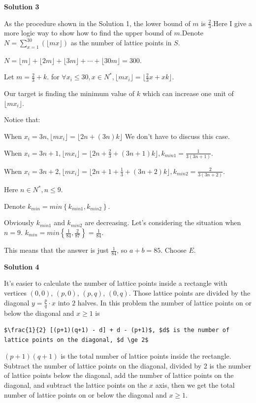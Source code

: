 \begin{enumerate}
\textbf{Solution 3}

As the procedure shown in the Solution 1, the lower bound of $m$ is $\frac{2}{3}.$Here I give a more logic way to show how to find the upper bound of $m.$Denote $N=\sum_{x=1}^{30}(\lfloor mx \rfloor)$ as the number of lattice points in $S$.

 $N = \lfloor m \rfloor+\lfloor 2m \rfloor+\lfloor 3m \rfloor+\cdots+\lfloor 30m \rfloor = 300 .$

 Let $m = \frac{2}{3}+k$. for $\forall x_{i}\le 30, x\in N^{*},  \lfloor mx_{i} \rfloor = \lfloor \frac{2}{3}x+xk \rfloor.$

 Our target is finding the minimum value of $k$ which can increase one unit of $\lfloor mx_{i} \rfloor .$

 Notice that:

 When $x_{i} = 3n, \lfloor mx_{i} \rfloor = \lfloor 2n+(3n)k \rfloor$ We don't have to discuss this case.

 When $x_{i} = 3n+1, \lfloor mx_{i} \rfloor = \lfloor 2n+\frac{2}{3}+(3n+1)k \rfloor, k_{min1}=\frac{1}{3(3n+1)}.$

 When $x_{i} = 3n+2, \lfloor mx_{i} \rfloor = \lfloor 2n+1+\frac{1}{3}+(3n+2)k \rfloor, k_{min2}=\frac{2}{3(3n+2)}.$ 

 Here $n\in N^{*}, n \le 9.$

 Denote $k_{min}=min\left \{k_{min1},k_{min2}  \right \}.$

 Obviously $k_{min1}$ and $k_{min2}$ are decreasing. Let's considering the situation when $n=9.$
$k_{min}=min\left\{\frac{1}{84},\frac{2}{87}\right\}=\frac{1}{84}.$

 This means that the answer is just $\frac{1}{84}$, so $a+b=85$.  Choose $\boxed{E}.$




\textbf{Solution 4}

It's easier to calculate the number of lattice points inside a rectangle with vertices $(0,0)$, $(p,0)$, $(p,q)$, $(0,q)$. Those lattice points are divided by the diagonal $y = \frac{p}{q} \cdot x$ into $2$ halves. In this problem the number of lattice points on or below the diagonal and $x \ge 1$ is

 \begin{verbatim}
$\frac{1}{2} [(p+1)(q+1) - d] + d - (p+1)$, $d$ is the number of lattice points on the diagonal, $d \ge 2$
\end{verbatim}

$(p+1)(q+1)$ is the total number of lattice points inside the rectangle. Subtract the number of lattice points on the diagonal, divided by 2 is the number of lattice points below the diagonal, add the number of lattice points on the diagonal, and subtract the lattice points on the $x$ axis, then we get the total number of lattice points on or below the diagonal and $x \ge 1$.


\end{enumerate}
